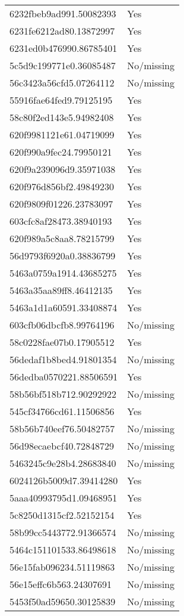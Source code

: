 \begin{tabular}{ll}
6232fbeb9ad991.50082393 & Yes \\
6231fe6212ad80.13872997 & Yes \\
6231ed0b476990.86785401 & Yes \\
5c5d9c199771e0.36085487 & No/missing \\
56c3423a56cfd5.07264112 & No/missing \\
55916fae64fed9.79125195 & Yes \\
58c80f2ed143e5.94982408 & Yes \\
620f9981121e61.04719099 & Yes \\
620f990a9fec24.79950121 & Yes \\
620f9a239096d9.35971038 & Yes \\
620f976d856bf2.49849230 & Yes \\
620f9809f01226.23783097 & Yes \\
603cfc8af28473.38940193 & Yes \\
620f989a5c8aa8.78215799 & Yes \\
56d9793f6920a0.38836799 & Yes \\
5463a0759a1914.43685275 & Yes \\
5463a35aa89ff8.46412135 & Yes \\
5463a1d1a60591.33408874 & Yes \\
603cfb06dbcfb8.99764196 & No/missing \\
58c0228fae07b0.17905512 & Yes \\
56dedaf1b8bed4.91801354 & No/missing \\
56dedba0570221.88506591 & Yes \\
58b56bf518b712.90292922 & No/missing \\
545cf34766cd61.11506856 & Yes \\
58b56b740eef76.50482757 & No/missing \\
56d98ecaebcf40.72848729 & No/missing \\
5463245c9e28b4.28683840 & No/missing \\
6024126b5009d7.39414280 & Yes \\
5aaa40993795d1.09468951 & Yes \\
5c8250d1315cf2.52152154 & Yes \\
58b99cc5443772.91366574 & No/missing \\
5464c151101533.86498618 & No/missing \\
56e15fab096234.51119863 & No/missing \\
56e15effc6b563.24307691 & No/missing \\
5453f50ad59650.30125839 & No/missing \\

\end{tabular}

